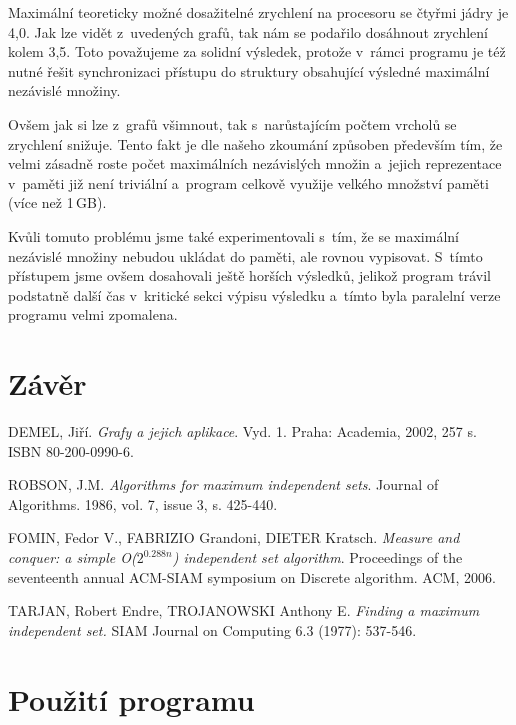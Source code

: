 \documentclass[12pt]{article}
\begin{document}
Maximální teoreticky možné dosažitelné zrychlení na procesoru se čtyřmi jádry je 4,0. Jak lze vidět z~uvedených grafů, tak nám se podařilo dosáhnout zrychlení kolem 3,5. Toto považujeme za solidní výsledek, protože v~rámci programu je též nutné řešit synchronizaci přístupu do struktury obsahující výsledné maximální nezávislé množiny. 

Ovšem jak si lze z~grafů všimnout, tak s~narůstajícím počtem vrcholů se zrychlení snižuje. Tento fakt je dle našeho zkoumání způsoben především tím, že velmi zásadně roste počet maximálních nezávislých množin a~jejich reprezentace v~paměti již není triviální a~program celkově využije velkého množství paměti (více než 1\,GB). 

Kvůli tomuto problému jsme také experimentovali s~tím, že se maximální nezávislé množiny nebudou ukládat do paměti, ale rovnou vypisovat. S~tímto přístupem jsme ovšem dosahovali ještě horších výsledků, jelikož program trávil podstatně další čas v~kritické sekci výpisu výsledku a~tímto byla paralelní verze programu velmi zpomalena. 

\section{Závěr}

\begin{thebibliography}{99}

    DEMEL, Jiří. \emph{Grafy a jejich aplikace}. Vyd. 1. Praha: Academia, 2002, 257 s. ISBN 80-200-0990-6.

ROBSON, J.M. \emph{Algorithms for maximum independent sets}. Journal of Algorithms. 1986, vol. 7, issue 3, s. 425-440.

  FOMIN, Fedor V., FABRIZIO Grandoni, DIETER Kratsch.
  \emph{Measure and conquer: a simple O($2^{0.288n}$) independent set algorithm}.
  Proceedings of the seventeenth annual ACM-SIAM symposium on Discrete algorithm.
   ACM, 2006.

  TARJAN, Robert Endre, TROJANOWSKI Anthony E.
  \emph{Finding a maximum independent set.}
  SIAM Journal on Computing 6.3 (1977): 537-546.

\end{thebibliography}

\appendix
\section{Použití programu} \label{appendix:ProgramUsage}
\end{document}
